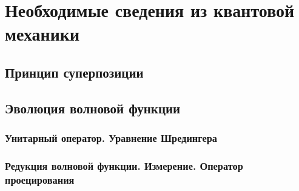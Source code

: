 \section{Необходимые сведения из квантовой механики}

\subsection{Принцип суперпозиции}

\subsection{Эволюция волновой функции}

\subsubsection{Унитарный оператор. Уравнение Шредингера}

\subsubsection{Редукция волновой функции. Измерение. Оператор проецирования}


